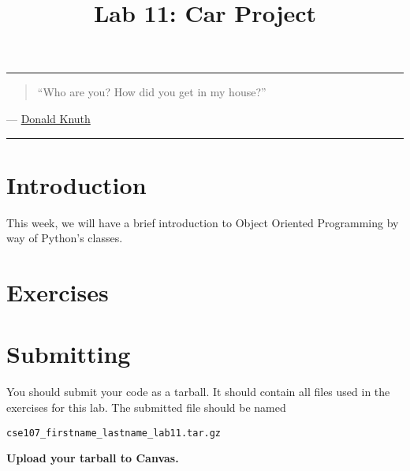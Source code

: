 \documentclass[11pt]{cselabheader}
\title{Lab 11: Car Project}
\begin{document}
\maketitle

\hrule
\begin{quotation}
``Who are you? How did you get in my house?''
\end{quotation}
\begin{flushright}
  --- \href{https://xkcd.com/163/}{Donald Knuth}
\end{flushright}

\hrule

\section{Introduction}
This week, we will have a brief introduction to Object Oriented Programming by
way of Python's classes.


\clearpage
\section{Exercises}
\label{sec:ex}

\begin{ex}[car.py]
\end{ex}

\pagebreak
\section{Submitting}
You should submit your code as a tarball. It should contain all files
used in the exercises for this lab. The submitted file should be named
\begin{center}
  \texttt{cse107\_firstname\_lastname\_lab11.tar.gz}
\end{center}

\begin{center}
  \textbf{Upload your tarball to Canvas.}
\end{center}

\listoftheorems
\end{document}
